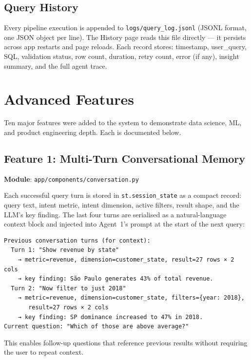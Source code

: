 \documentclass[12pt,a4paper]{report}
\begin{document}
\section{Query History}

Every pipeline execution is appended to \texttt{logs/query\_log.jsonl} (JSONL format, one
JSON object per line). The History page reads this file directly — it persists across app
restarts and page reloads. Each record stores: timestamp, user\_query, SQL, validation status,
row count, duration, retry count, error (if any), insight summary, and the full agent trace.

\chapter{Advanced Features}
\label{ch:features}

Ten major features were added to the system to demonstrate data science, ML, and product
engineering depth. Each is documented below.

\section{Feature 1: Multi-Turn Conversational Memory}

\textbf{Module}: \texttt{app/components/conversation.py}

Each successful query turn is stored in \texttt{st.session\_state} as a compact record:
query text, intent metric, intent dimension, active filters, result shape, and the LLM's
key finding. The last four turns are serialised as a natural-language context block and
injected into Agent~1's prompt at the start of the next query:

\begin{lstlisting}[caption={Conversation context block injected into Agent 1}]
Previous conversation turns (for context):
  Turn 1: "Show revenue by state"
    → metric=revenue, dimension=customer_state, result=27 rows × 2 cols
    → key finding: São Paulo generates 43% of total revenue.
  Turn 2: "Now filter to just 2018"
    → metric=revenue, dimension=customer_state, filters={year: 2018},
       result=27 rows × 2 cols
    → key finding: SP dominance increased to 47% in 2018.
Current question: "Which of those are above average?"
\end{lstlisting}

This enables follow-up questions that reference previous results without requiring the user to
repeat context.
\end{document}
